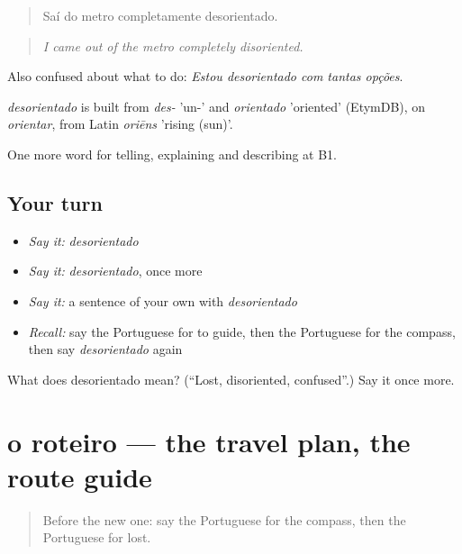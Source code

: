 \begin{quote}
Saí do metro completamente desorientado.
\end{quote}

\begin{quote}
\emph{I came out of the metro completely disoriented.}
\end{quote}

Also confused about what to do: \emph{Estou desorientado com tantas opções}.

\begin{cousinweb}
\emph{desorientado} is built from \emph{des-} 'un-' and \emph{orientado} 'oriented' (EtymDB), on \emph{orientar}, from Latin \emph{oriēns} 'rising (sun)'.
\end{cousinweb}

\begin{grammarlens}[title={What you've built}]
One more word for telling, explaining and describing at B1.
\end{grammarlens}

\subsection*{Your turn}
\begin{itemize}
\raggedright
  \item \emph{Say it:} \emph{desorientado}
  \item \emph{Say it:} \emph{desorientado}, once more
  \item \emph{Say it:} a sentence of your own with \emph{desorientado}
  \item \emph{Recall:} say the Portuguese for to guide, then the Portuguese for the compass, then say \emph{desorientado} again
\end{itemize}

\begin{tcolorbox}[breakable,colback=teal!4,colframe=teal!35!black,title={Before you move on}]
What does desorientado mean? (\textquotedblleft{}Lost, disoriented, confused\textquotedblright{}.) Say it once more.
\end{tcolorbox}
\section[o roteiro]{o roteiro — the travel plan, the route guide}

\label{lesson:PT-C435-roteiro}



\begin{quote}
Before the new one: say the Portuguese for the compass, then the Portuguese for lost.
\end{quote}

